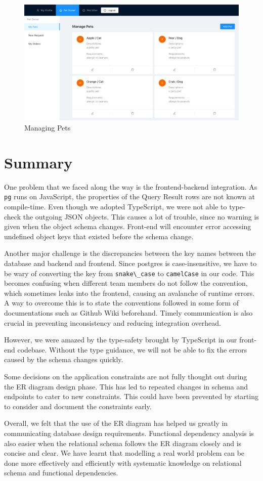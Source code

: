 \documentclass[
  paper=a4,
  ,captions=tableheading
]{scrartcl}
\newcommand{\passthrough}[1]{#1}
\begin{document}
\begin{figure}
\centering
\includegraphics{manage-pet.png}
\caption{Managing Pets}
\end{figure}

\hypertarget{summary}{%
\section{Summary}\label{summary}}

One problem that we faced along the way is the frontend-backend
integration. As \passthrough{\lstinline!pg!} runs on JavaScript, the
properties of the Query Result rows are not known at compile-time. Even
though we adopted TypeScript, we were not able to type-check the
outgoing JSON objects. This causes a lot of trouble, since no warning is
given when the object schema changes. Front-end will encounter error
accessing undefined object keys that existed before the schema change.

Another major challenge is the discrepancies between the key names
between the database and backend and frontend. Since postgres is
case-insensitive, we have to be wary of converting the key from
\passthrough{\lstinline!snake\_case!} to
\passthrough{\lstinline!camelCase!} in our code. This becomes confusing
when different team members do not follow the convention, which
sometimes leaks into the frontend, causing an avalanche of runtime
errors. A way to overcome this is to state the conventions followed in
some form of documentations such as Github Wiki beforehand. Timely
communication is also crucial in preventing inconsistency and reducing
integration overhead.

However, we were amazed by the type-safety brought by TypeScript in our
front-end codebase. Without the type guidance, we will not be able to
fix the errors caused by the schema changes quickly.

Some decisions on the application constraints are not fully thought out
during the ER diagram design phase. This has led to repeated changes in
schema and endpoints to cater to new constraints. This could have been
prevented by starting to consider and document the constraints early.

Overall, we felt that the use of the ER diagram has helped us greatly in
communicating database design requirements. Functional dependency
analysis is also easier when the relational schema follows the ER
diagram closely and is concise and clear. We have learnt that modelling
a real world problem can be done more effectively and efficiently with
systematic knowledge on relational schema and functional dependencies.
\end{document}
